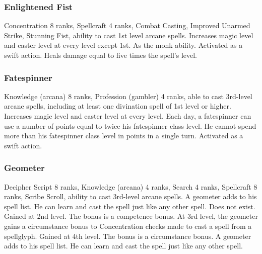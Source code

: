 \subsubsection{Enlightened Fist}
 Concentration 8 ranks, Spellcraft 4 ranks, Combat Casting, Improved Unarmed Strike, Stunning Fist, ability to cast 1st level arcane spells.
 Increases magic level and caster level at every level except 1st.
 As the monk ability.
 Activated as a swift action.
 Heals damage equal to five times the spell's level.
\subsubsection{Fatespinner}
 Knowledge (arcana) 8 ranks, Profession (gambler) 4 ranks, able to cast 3rd-level arcane spells, including at least one divination spell of 1st level or higher.
 Increases magic level and caster level at every level.
 Each day, a fatespinner can use a number of points equal to twice his fatespinner class level. He cannot spend more than his fatespinner class level in points in a single turn.
 Activated as a swift action.
\subsubsection{Geometer}
 Decipher Script 8 ranks, Knowledge (arcana) 4 ranks, Search 4 ranks, Spellcraft 8 ranks, Scribe Scroll, ability to cast 3rd-level arcane spells.
 A geometer adds  to his spell list. He can learn and cast the spell just like any other spell.
 Does not exist.
 Gained at 2nd level. The bonus is a competence bonus.
 At 3rd level, the geometer gains a  circumstance bonus to Concentration checks made to cast a spell from a spellglyph.
 Gained at 4th level.
 The bonus is a circumstance bonus.
 A geometer adds  to his spell list. He can learn and cast the spell just like any other spell.
